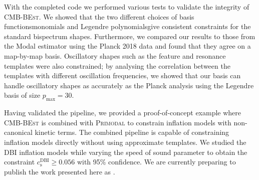 With the completed code we performed various tests to validate the integrity of \textsc{CMB-BEst}. We showed that the two different choices of basis functions\textemdash monomials and Legendre polynomials\textemdash give consistent constraints for the standard bispectrum shapes. Furthermore, we compared our results to those from the Modal estimator using the Planck 2018 data and found that they agree on a map-by-map basis. Oscillatory shapes such as the feature and resonance templates were also constrained; by analysing the correlation between the templates with different oscillation frequencies, we showed that our basis can handle oscillatory shapes as accurately as the Planck analysis using the Legendre basis of size $p_\text{max}=30$.

Having validated the pipeline, we provided a proof-of-concept example where \textsc{CMB-BEst} is combined with \textsc{Primodal} to constrain inflation models with non-canonical kinetic terms. The combined pipeline is capable of constraining inflation models directly without using approximate templates. We studied the DBI inflation models while varying the speed of sound parameter to obtain the constraint $c_\text{s}^\text{DBI} \ge 0.056$ with 95\% confidence. We are currently preparing to publish the work presented here as \cite{Sohn2021inprep}.





%		
%		
%		
